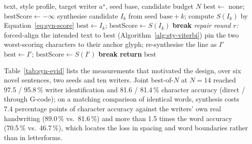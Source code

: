\begin{algorithm}[!htbp]
\caption{\texttt{SynthesizeJointBestOf}: candidate search with joint scoring and repair}
\label{alg:syn-search}
\begin{algorithmic}[1]
\REQUIRE text, style profile, target writer $a^\star$, seed base, candidate budget $N$
\STATE $\mathrm{best}\leftarrow$ none; $\mathrm{bestScore}\leftarrow-\infty$
    \STATE synthesise candidate $I_k$ from seed $\mathrm{base}+k$; compute $S(I_k)$ by Equation~\ref{eq:syn-score}
        \STATE $\mathrm{best}\leftarrow I_k$; $\mathrm{bestScore}\leftarrow S(I_k)$
    \ENDIF
        \STATE \textbf{break} 
    \ENDIF
\ENDFOR
{}
    \STATE \emph{repair round $r$:} forced-align the intended text to $\mathrm{best}$ (Algorithm~\ref{alg:sty-viterbi})
    \STATE pin the two worst-scoring characters to their anchor glyph; re-synthesise the line as $I'$
        \STATE $\mathrm{best}\leftarrow I'$; $\mathrm{bestScore}\leftarrow S(I')$
    \ELSE
        \STATE \textbf{break} 
    \ENDIF
\ENDFOR
\STATE \textbf{return} $\mathrm{best}$
\end{algorithmic}
\end{algorithm}

Table~\ref{tab:syn-evid} lists the measurements that motivated the design, over six novel sentences, two seeds and ten writers. Joint best-of-$N$ at $N=14$ reached 97.5 / 95.8\,\% writer identification and 81.6 / 81.4\,\% character accuracy (direct / through G-code); on a matching comparison of identical words, synthesis costs 7.4 percentage points of character accuracy against the writers' own real handwriting (89.0\,\% vs.\ 81.6\,\%) and more than 1.5 times the word accuracy (70.5\,\% vs.\ 46.7\,\%), which locates the loss in spacing and word boundaries rather than in letterforms.

